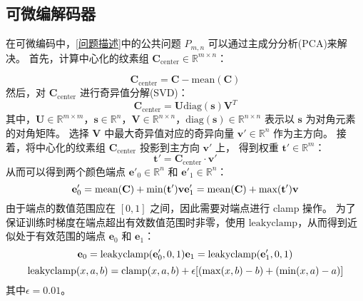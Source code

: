 \subsection{可微编解码器}

在可微编码中，\ref{问题描述}中的公共问题 $P_{m,n}$ 可以通过主成分分析(PCA)来解决。
首先，计算中心化的纹素组 $\mathbf{C}_{\text{center}}\in\mathbb{R}^{m\times n}$：

\begin{equation}
\mathbf{C}_{\text{center}}=\mathbf{C}-\text{mean}(\mathbf{C})
\end{equation}
然后，对 $\mathbf{C}_{\text{center}}$ 进行奇异值分解(SVD)：
\begin{equation}
\mathbf{C}_{\text{center}}=\mathbf{U}\text{diag}(\mathbf{s})\mathbf{V}^T
\end{equation}
其中，$\mathbf{U}\in \mathbb{R}^{m \times m}$，$\mathbf{s}\in \mathbb{R}^{n}$，$\mathbf{V}\in \mathbb{R}^{n\times n}$，$\text{diag}(\mathbf{s})\in\mathbb{R}^{n\times n}$ 表示以 $\mathbf{s}$ 为对角元素的对角矩阵。
选择 $\mathbf{V}$ 中最大奇异值对应的奇异向量 $\mathbf{v}'\in \mathbb{R}^{n}$ 作为主方向。
接着，将中心化的纹素组 $\mathbf{C}_\text{center}$ 投影到主方向 $\mathbf{v}'$ 上，
得到权重 $\mathbf{t}'\in\mathbb{R}^{m}$：
\begin{equation}
\mathbf{t}'=\mathbf{C}_{\text{center}}\cdot\mathbf{v}'
\end{equation}
从而可以得到两个颜色端点 $\mathbf{e}'_0\in\mathbb{R}^n$ 和 $\mathbf{e}'_1\in\mathbb{R}^n$：
\begin{equation}
\mathbf{e}'_0=\text{mean}(\mathbf{C})+\text{min}(\mathbf{t}')\mathbf{v}\\
\mathbf{e}'_1=\text{mean}(\mathbf{C})+\text{max}(\mathbf{t}')\mathbf{v}
\end{equation}
由于端点的数值范围应在 $[0,1]$ 之间，因此需要对端点进行 clamp 操作。
为了保证训练时梯度在端点超出有效数值范围时非零，使用 $\text{leakyclamp}$，从而得到近似处于有效范围的端点 $\mathbf{e}_0$ 和 $\mathbf{e}_1$：
\begin{equation}
\mathbf{e}_0=\text{leakyclamp}(\mathbf{e}'_0,0,1)\\
\mathbf{e}_1=\text{leakyclamp}(\mathbf{e}'_1,0,1)
\end{equation}
\begin{equation}
\text{leakyclamp}(x,a,b)=\text{clamp}(x,a,b)\\
                        +\epsilon[(\max(x,b)-b)+(\min(x,a)-a)]
\end{equation}
其中$\epsilon=0.01$。


